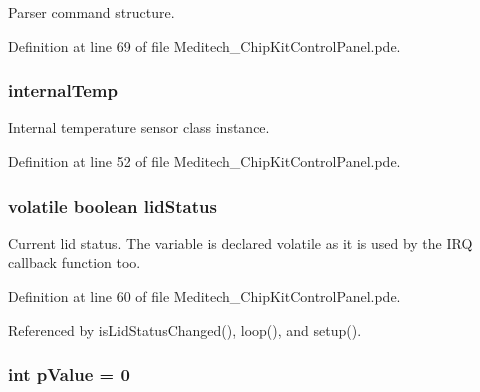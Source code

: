Parser command structure. 



Definition at line 69 of file Meditech\-\_\-\-Chip\-Kit\-Control\-Panel.\-pde.

\hypertarget{_meditech___chip_kit_control_panel_8pde_adcfca3504612462229db71750def77f9}{
\subsubsection[{internal\-Temp}]{ internal\-Temp}}\label{_meditech___chip_kit_control_panel_8pde_adcfca3504612462229db71750def77f9}


Internal temperature sensor class instance. 



Definition at line 52 of file Meditech\-\_\-\-Chip\-Kit\-Control\-Panel.\-pde.

\hypertarget{_meditech___chip_kit_control_panel_8pde_adea51712174a5f82a31231a67e0d4608}{
\subsubsection[{lid\-Status}]{\setlength{\rightskip}{0pt plus 5cm}volatile boolean lid\-Status}}\label{_meditech___chip_kit_control_panel_8pde_adea51712174a5f82a31231a67e0d4608}


Current lid status. The variable is declared volatile as it is used by the I\-R\-Q callback function too. 



Definition at line 60 of file Meditech\-\_\-\-Chip\-Kit\-Control\-Panel.\-pde.



Referenced by is\-Lid\-Status\-Changed(), loop(), and setup().

\hypertarget{_meditech___chip_kit_control_panel_8pde_a3134d7e85042180eb421c3f6ee88d3b3}{
\subsubsection[{p\-Value}]{\setlength{\rightskip}{0pt plus 5cm}int p\-Value = 0}}\label{_meditech___chip_kit_control_panel_8pde_a3134d7e85042180eb421c3f6ee88d3b3}


